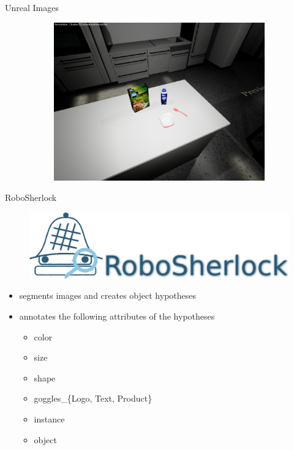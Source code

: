 \documentclass[]{beamer}
\begin{document}
\begin{frame}{Unreal Images}
\begin{figure}
\begin{subfigure}[b]{0.3\textwidth}
		\includegraphics[scale=.07]{../thesis/img/chapter3/sceneEx_5}	
	\end{subfigure}
\end{figure}
\end{frame}


\begin{frame}{RoboSherlock}
	\begin{figure}
		\includegraphics[scale=.3]{img/rs_logo_text.png}
	\end{figure}
	\begin{itemize}
		\item segments images and creates object hypotheses
		\item annotates the following attributes of the hypotheses
		\begin{itemize}
			\item color
			\item size
			\item shape
			\item goggles\_\{Logo, Text, Product\}
			\item instance
			\item object
		\end{itemize}
	\end{itemize}
\end{frame}
\end{document}
